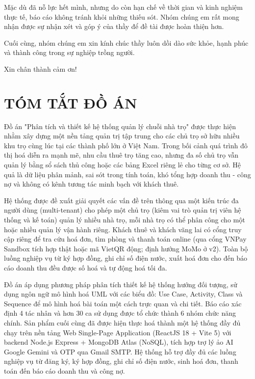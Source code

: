\documentclass[a4paper,oneside]{report}
\newcommand{\chuongkhongso}[1]{%
  \chapter*{#1}%
  \addcontentsline{toc}{chapter}{#1}}
\begin{document}
Mặc dù đã nỗ lực hết mình, nhưng do còn hạn chế về thời gian và kinh
nghiệm thực tế, báo cáo không tránh khỏi những thiếu sót. Nhóm chúng em
rất mong nhận được sự nhận xét và góp ý của thầy để đề tài được hoàn
thiện hơn.

Cuối cùng, nhóm chúng em xin kính chúc thầy luôn dồi dào sức khỏe, hạnh
phúc và thành công trong sự nghiệp trồng người.

Xin chân thành cảm ơn!

\chuongkhongso{TÓM TẮT ĐỒ ÁN}

Đồ án "Phân tích và thiết kế hệ thống quản lý chuỗi nhà trọ" được thực
hiện nhằm xây dựng một nền tảng quản trị tập trung cho các chủ trọ sở
hữu nhiều khu trọ cùng lúc tại các thành phố lớn ở Việt Nam. Trong bối
cảnh quá trình đô thị hoá diễn ra mạnh mẽ, nhu cầu thuê trọ tăng cao,
nhưng đa số chủ trọ vẫn quản lý bằng sổ sách thủ công hoặc các bảng
Excel riêng lẻ cho từng cơ sở. Hệ quả là dữ liệu phân mảnh, sai sót
trong tính toán, khó tổng hợp doanh thu - công nợ và không có kênh tương
tác minh bạch với khách thuê.

Hệ thống được đề xuất giải quyết các vấn đề trên thông qua một kiến trúc
đa người dùng (multi-tenant) cho phép một chủ trọ (kiêm vai trò quản trị
viên hệ thống và kế toán) quản lý nhiều nhà trọ, mỗi nhà trọ có thể phân
công cho một hoặc nhiều quản lý vận hành riêng. Khách thuê và khách vãng
lai có cổng truy cập riêng để tra cứu hoá đơn, tìm phòng và thanh toán
online (qua cổng VNPay Sandbox tích hợp thật hoặc mã VietQR động; định
hướng MoMo ở v2). Toàn bộ luồng nghiệp vụ từ ký hợp đồng, ghi chỉ số
điện nước, xuất hoá đơn cho đến báo cáo doanh thu đều được số hoá và tự
động hoá tối đa.

Đồ án áp dụng phương pháp phân tích thiết kế hệ thống hướng đối tượng,
sử dụng ngôn ngữ mô hình hoá UML với các biểu đồ: Use Case, Activity,
Class và Sequence để mô hình hoá bài toán một cách trực quan và chi
tiết. Báo cáo xác định 4 tác nhân và hơn 30 ca sử dụng được tổ chức
thành 6 nhóm chức năng chính. Sản phẩm cuối cùng đã được hiện thực hoá
thành một hệ thống đầy đủ chạy trên nền tảng Web Single-Page Application
(ReactJS 18 + Vite 5) với backend Node.js Express + MongoDB Atlas
(NoSQL), tích hợp trợ lý ảo AI Google Gemini và OTP qua Gmail SMTP. Hệ
thống hỗ trợ đầy đủ các luồng nghiệp vụ từ đăng ký, ký hợp đồng, ghi chỉ
số điện nước, sinh hoá đơn, thanh toán đến báo cáo doanh thu và công nợ.
\end{document}
